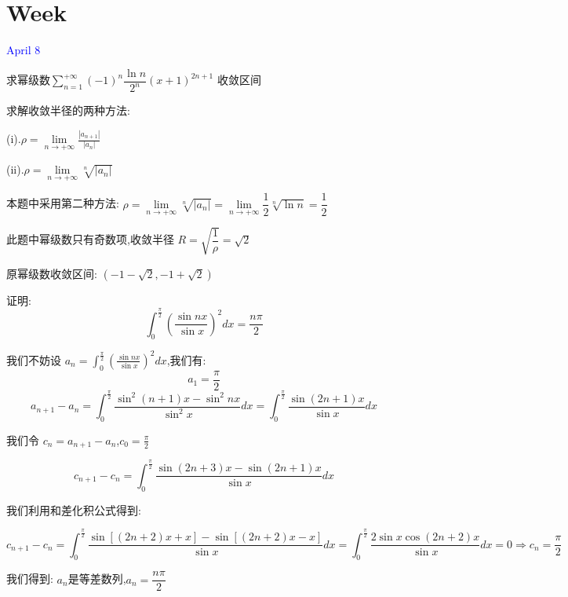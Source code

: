 \section{Week }
\textcolor{blue}{April 8}

\begin{example}[][Exam: 30.2.1]
	求幂级数$\sum\limits_{n=1}^{+\infty}(-1)^{n}\dfrac{\ln n}{2^{n}}(x+1)^{2n+1}$ 收敛区间
\end{example}

\begin{solution}
	
	求解收敛半径的两种方法: 
	
	(i).$\rho=\lim\limits_{n\to +\infty}\frac{|a_{n+1}|}{|a_{n}|}$
	
	(ii).$\rho=\lim\limits_{n\to +\infty}\sqrt[n]{|a_{n}|}$
	
	本题中采用第二种方法: $\rho=\lim\limits_{n\to +\infty}\sqrt[n]{|a_{n}|}=\lim\limits_{n\to +\infty}\dfrac{1}{2}\sqrt[n]{\ln n}=\dfrac{1}{2}$
	
	此题中幂级数只有奇数项,收敛半径 $R=\sqrt{\dfrac{1}{\rho}}=\sqrt{2}$
	
	原幂级数收敛区间: $(-1-\sqrt{2},-1+\sqrt{2})$
\end{solution}

\begin{example}[][Exam: 30.2.2]
	证明: $$\int_{0}^{\frac{\pi}{2}}\left( \dfrac{\sin nx}{\sin x}\right) ^2dx=\dfrac{n\pi}{2}$$
\end{example}

\begin{solution}
	
	我们不妨设 $a_{n}=\int_{0}^{\frac{\pi}{2}}(\frac{\sin nx}{\sin x})^2dx$,我们有: 
	$$a_{1}=\frac{\pi}{2}$$ $$a_{n+1}-a_{n}=\int_{0}^{\frac{\pi}{2}}\frac{\sin ^2(n+1)x-\sin^2 nx}{\sin^2 x}dx=\int_{0}^{\frac{\pi}{2}}\frac{\sin (2n+1)x}{\sin x}dx$$
	
	我们令 $c_{n}=a_{n+1}-a_{n}$,$c_{0}=\frac{\pi}{2}$
	
	$$c_{n+1}-c_{n}=\int_{0}^{\frac{\pi}{2}}\frac{\sin (2n+3)x-\sin (2n+1)x}{\sin x}dx$$
	
	我们利用和差化积公式得到: 
	
	$$c_{n+1}-c_{n}=\int_{0}^{\frac{\pi}{2}}\frac{\sin [(2n+2)x+x]-\sin [(2n+2)x-x]}{\sin x}dx=\int_{0}^{\frac{\pi}{2}}\frac{2\sin x\cos(2n+2)x}{\sin x}dx=0\Rightarrow c_{n}=\frac{\pi}{2}$$
	
	我们得到: $a_{n}$是等差数列,$a_{n}=\dfrac{n\pi}{2}$
\end{solution}


